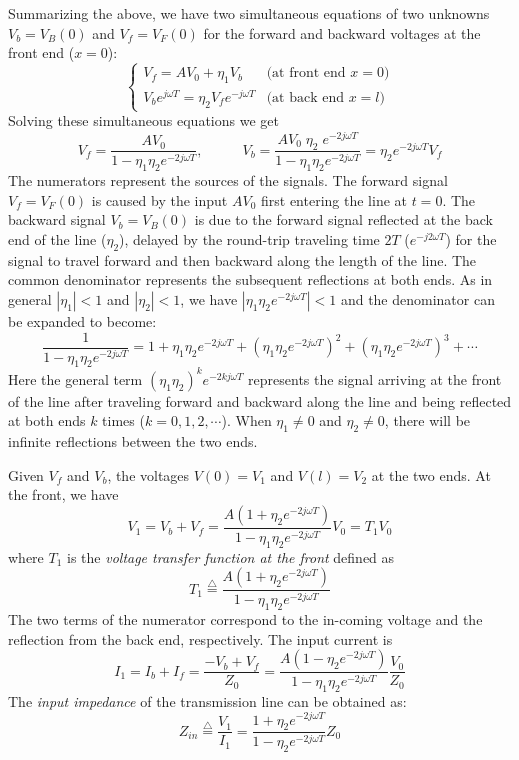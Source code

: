 Summarizing the above, we have two simultaneous equations of two unknowns
$V_b=V_B(0)$ and $V_f=V_F(0)$ for the forward and backward voltages at the
front end ($x=0$):
\[ \left\{ \begin{array}{ll}
V_f=AV_0+\eta_1V_b & \mbox{(at front end $x=0$)} \\
V_be^{j\omega T}=\eta_2V_fe^{-j\omega T} & \mbox{(at back end $x=l$)}
	\end{array} \right. \]
Solving these simultaneous equations we get
\[ V_f=\frac{AV_0}{1-\eta_1\eta_2e^{-2j\omega T}},\;\;\;\;\;\;\;\;\;\;
   V_b=\frac{AV_0\;\eta_2\;e^{-2j\omega T}}{1-\eta_1\eta_2e^{-2j\omega T}}
   =\eta_2e^{-2j\omega T} V_f
\]
The numerators represent the sources of the signals. The forward signal 
$V_f=V_F(0)$ is caused by the input $AV_0$ first entering the line at $t=0$.
The backward signal $V_b=V_B(0)$ is due to the forward signal reflected at 
the back end of the line ($\eta_2$), delayed by the round-trip traveling 
time $2T$ ($e^{-j2\omega T}$) for the signal to travel forward and then backward 
along the length of the line. The common denominator represents the subsequent
reflections at both ends. As in general $|\eta_1|<1$ and $|\eta_2|<1$, we 
have $|\eta_1\eta_2e^{-2j\omega T}|<1$ and the denominator can be expanded to 
become:
\[	\frac{1}{1-\eta_1\eta_2e^{-2j\omega T}}=1+\eta_1\eta_2e^{-2j\omega T}
	+(\eta_1\eta_2e^{-2j\omega T})^2+(\eta_1\eta_2e^{-2j\omega T})^3+\cdots 
\]
Here the general term $(\eta_1\eta_2)^ke^{-2kj\omega T}$ represents the signal 
arriving at the front of the line after traveling forward and backward along 
the line and being reflected at both ends $k$ times ($k=0,1,2,\cdots$). When 
$\eta_1\ne 0$ and  $\eta_2\ne 0$, there will be infinite reflections between
the two ends.

Given $V_f$ and $V_b$, the voltages $V(0)=V_1$ and $V(l)=V_2$ at the two ends.
At the front, we have
\[ V_1=V_b+V_f=\frac{A(1+\eta_2e^{-2j\omega T})}{1-\eta_1\eta_2e^{-2j\omega T}}V_0 = T_1V_0 \]
where $T_1$ is the {\em voltage transfer function at the front} 
defined as
\[ T_1\stackrel{\triangle}{=}\frac{A(1+\eta_2e^{-2j\omega T})}{1-\eta_1\eta_2e^{-2j\omega T}}	\]
The two terms of the numerator correspond to the in-coming voltage and the
reflection from the back end, respectively. The input current is
\[  I_1=I_b+I_f=\frac{-V_b+V_f}{Z_0}
=\frac{A(1-\eta_2e^{-2j\omega T})}{1-\eta_1\eta_2e^{-2j\omega T}} \frac{V_0}{Z_0}	\]
The {\em input impedance} of the transmission line can be obtained as:
\[ Z_{in}\stackrel{\triangle}{=}\frac{V_1}{I_1}=\frac{1+\eta_2e^{-2j\omega T}}{1-\eta_2e^{-2j\omega T}}
Z_0 \]

